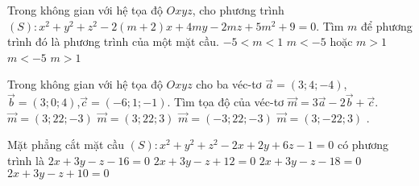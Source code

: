 \begin{ex}%
Trong không gian với hệ tọa độ $Oxyz$, cho phương trình $(S): x^2+y^2+z^2-2(m+2)x+4my-2mz+5m^2+9=0$. Tìm $m$ để phương trình đó là phương trình của một mặt cầu.
\choice
{$-5<m<1$}
{\True $m<-5$ hoặc $m>1$}
{$m<-5$}
{$m>1$}
\end{ex}
\begin{ex}%
Trong không gian với hệ tọa độ $Oxyz$ cho ba véc-tơ $\vec{a} =(3;4;-4)$, $\vec {b}=(3;0;4)$,$\vec {c}=(-6;1;-1)$. Tìm tọa độ của véc-tơ $\vec{m}=3\vec{a}-2\vec{b}+\vec{c}$.
\choice
{\True $\vec{m}=(3;22;-3)$}
{$\vec{m}=(3;22;3)$}
{$\vec{m}=(-3;22;-3)$}
{$\vec{m}=(3;-22;3)$}
.
\end{ex}
\begin{ex}%
Mặt phẳng cắt mặt cầu $(S): x^2+y^2+z^2-2x+2y+6z-1=0$ có phương trình là
\choice
{$2x+3y-z-16=0$}
{$2x+3y-z+12=0$}
{$2x+3y-z-18=0$}
{\True $2x+3y-z+10=0$}
\end{ex}
